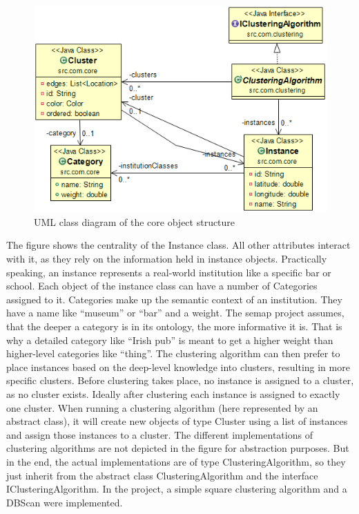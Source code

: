 \begin{figure}
  \centering
    \includegraphics[scale=0.7]{./content/cos.png}
  \caption{UML class diagram of the core object structure}\label{fig:cos}
\end{figure}


The figure shows the centrality of the Instance class. All other attributes interact with it, as they rely on the information held in instance objects. Practically speaking, an instance represents a real-world institution like a specific bar or school. Each object of the instance class can have a number of Categories assigned to it. Categories make up the semantic context of an institution. They have a name like “museum” or “bar” and a weight. The semap project assumes, that the deeper a category is in its ontology, the more informative it is. That is why a detailed category like “Irish pub” is meant to get a higher weight than higher-level categories like “thing”. The clustering algorithm can then prefer to place instances based on the deep-level knowledge into clusters, resulting in more specific clusters.
Before clustering takes place, no instance is assigned to a cluster, as no cluster exists. Ideally after clustering each instance is assigned to exactly one cluster. When running a clustering algorithm (here represented by an abstract class), it will create new objects of type Cluster using a list of instances and assign those instances to a cluster. The different implementations of clustering algorithms are not depicted in the figure for abstraction purposes. But in the end, the actual implementations are of type ClusteringAlgorithm, so they just inherit from the abstract class ClusteringAlgorithm and the interface IClusteringAlgorithm. In the project, a simple square clustering algorithm and a DBScan were implemented.


